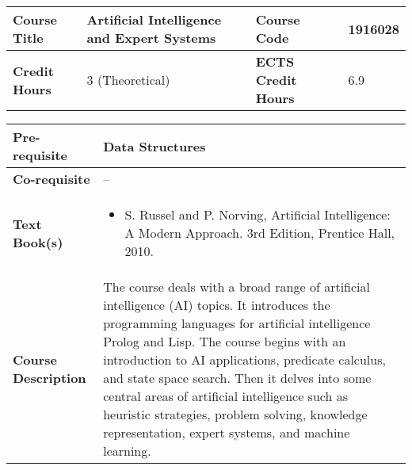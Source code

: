 \documentclass[12pt]{article}
\begin{document}
\begin{minipage}{\textwidth}
\begin{tabularx}{\textwidth}{|l|X|l|X|}
\hline
\textbf{Course Title}       &  Artificial Intelligence and Expert Systems & \textbf{Course Code}       &  1916028 \\ \hline
\textbf{Credit Hours}       &  3 (Theoretical) & \textbf{ECTS Credit Hours}       &   6.9 \\ \hline
\end{tabularx}

\begin{tabularx}{\textwidth}{|l|X|}
\hline
\textbf{Pre-requisite}      &  Data Structures \\ \hline
\textbf{Co-requisite}       &  -- \\ \hline
\textbf{Text Book(s)}      & \begin{minipage}{.70\textwidth}
					\begin{itemize} \itemsep-0.4em
						\vspace{3mm}
						\item S. Russel and P. Norving, Artificial Intelligence: A Modern Approach. 3rd Edition, Prentice Hall, 2010.
						\vspace{3mm}
					\end{itemize}
				\end{minipage}  \\ \hline
\textbf{Course Description} & \begin{minipage}{.70\textwidth}
					\vspace{3mm}
					The course deals with a broad range of artificial intelligence (AI) topics. It introduces the programming languages for artificial intelligence Prolog and Lisp. The course begins with an introduction to AI applications, predicate calculus, and state space search. Then it delves into some central areas of artificial intelligence such as heuristic strategies, problem solving, knowledge representation, expert systems, and machine learning. 

					\vspace{3mm}
					\end{minipage} \\ \hline
\end{tabularx}
\end{minipage}


\bigskip
\bigskip
\end{document}
